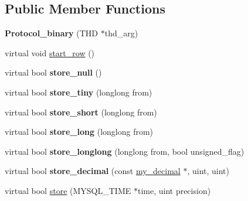 \subsection*{Public Member Functions}
\begin{DoxyCompactItemize}
\item 
\mbox{\label{classProtocol__binary_a9c216a9ad757f3ff04ee698b20532d1f}} 
{\bfseries Protocol\+\_\+binary} (T\+HD $\ast$thd\+\_\+arg)
\item 
virtual void \mbox{\hyperlink{classProtocol__binary_ae3111e401880cd6d68b3587e2fbb8091}{start\+\_\+row}} ()
\item 
\mbox{\label{classProtocol__binary_a8b3cfbdac770b2014cc5211231cd5b97}} 
virtual bool {\bfseries store\+\_\+null} ()
\item 
\mbox{\label{classProtocol__binary_ac36466dd120debc124e1c5f7df5c0a94}} 
virtual bool {\bfseries store\+\_\+tiny} (longlong from)
\item 
\mbox{\label{classProtocol__binary_af8d6794c4a1c13beb98ca262c8fb2b5d}} 
virtual bool {\bfseries store\+\_\+short} (longlong from)
\item 
\mbox{\label{classProtocol__binary_a1508bc2d28533e8620b0a45b362f0787}} 
virtual bool {\bfseries store\+\_\+long} (longlong from)
\item 
\mbox{\label{classProtocol__binary_ade30e1b7ba27d3d17386b0ab3288ba4f}} 
virtual bool {\bfseries store\+\_\+longlong} (longlong from, bool unsigned\+\_\+flag)
\item 
\mbox{\label{classProtocol__binary_aed6da3a209cd219a1c8a1d043816151d}} 
virtual bool {\bfseries store\+\_\+decimal} (const \mbox{\hyperlink{classmy__decimal}{my\+\_\+decimal}} $\ast$, uint, uint)
\item 
virtual bool \mbox{\hyperlink{classProtocol__binary_a6e11523fc3c24f22a333f39fd778f840}{store}} (M\+Y\+S\+Q\+L\+\_\+\+T\+I\+ME $\ast$time, uint precision)
\item 
\mbox{\label{classProtocol__binary_a9a26f16566f0a6c6048d46235a0c2073}} 

\end{DoxyCompactItemize}
